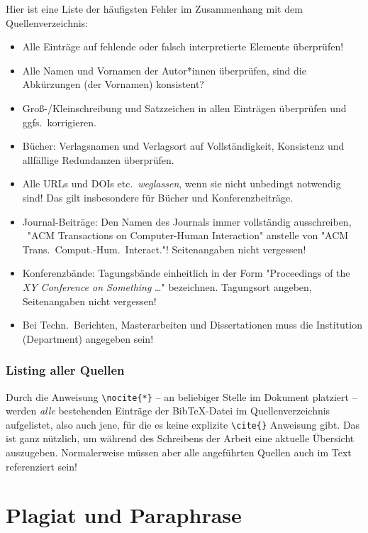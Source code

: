 Hier ist eine Liste der häufigsten Fehler im Zusammenhang mit dem Quellenverzeichnis:
%
\begin{itemize}
\item
Alle Einträge auf fehlende oder falsch interpretierte Elemente überprüfen!
\item
Alle Namen und Vornamen der Autor*innen überprüfen, sind die Abkürzungen (der Vornamen) konsistent?
\item
Groß-/Kleinschreibung und Satzzeichen in allen  Einträgen überprüfen und ggfs.\ korrigieren.
\item
Bücher: Verlagsnamen und Verlagsort auf Vollständigkeit, Konsistenz und allfällige
Redundanzen überprüfen.
\item
Alle URLs und DOIs etc.\ \emph{weglassen}, wenn sie nicht unbedingt notwendig sind! Das gilt insbesondere
für Bücher und Konferenzbeiträge.
\item
Journal-Beiträge: Den Namen des Journals immer vollständig ausschreiben, \zB\
"ACM Transactions on Computer-Human Interaction" anstelle von 
"ACM Trans.\ Comput.-Hum.\ Interact."! Seitenangaben nicht vergessen!
\item
Konferenzbände: 
Tagungsbände einheitlich in der Form "Proceedings of the \emph{XY Conference on Something} \ldots"
bezeichnen. Tagungsort angeben, Seitenangaben nicht vergessen!
\item
Bei Techn.\ Berichten, Masterarbeiten und Dissertationen muss die Institution (Department)
angegeben sein!
\end{itemize}
 

\subsubsection{Listing aller Quellen}

Durch die Anweisung \verb!\nocite{*}! -- an beliebiger Stelle im Dokument platziert -- werden \emph{alle} bestehenden Einträge der BibTeX-Datei im Quellenverzeichnis aufgelistet, also auch jene, für die es keine explizite \verb!\cite{}! Anweisung gibt. Das ist ganz nützlich, um während des Schreibens der Arbeit eine aktuelle Übersicht auszugeben. Normalerweise müssen aber alle angeführten Quellen auch im Text referenziert sein!



\section{Plagiat und Paraphrase}
\label{sec:Plagiarismus}

